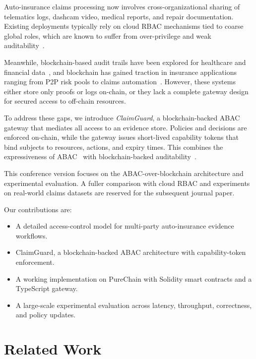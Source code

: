 \documentclass[conference]{IEEEtran}
\begin{document}
Auto-insurance claims processing now involves cross-organizational sharing of telematics logs, dashcam video, medical reports, and repair documentation. Existing deployments typically rely on cloud RBAC mechanisms tied to coarse global roles, which are known to suffer from over-privilege and weak auditability~\cite{hu_abac_nist, cloud_rbac_security}. 

Meanwhile, blockchain-based audit trails have been explored for healthcare and financial data~\cite{medrec, healthchain}, and blockchain has gained traction in insurance applications ranging from P2P risk pools to claims automation~\cite{nexusmutual, teambrella, cai_insurance_blockchain}. However, these systems either store only proofs or logs on-chain, or they lack a complete gateway design for secured access to off-chain resources.

To address these gaps, we introduce \emph{ClaimGuard}, a blockchain-backed ABAC gateway that mediates all access to an evidence store. Policies and decisions are enforced on-chain, while the gateway issues short-lived capability tokens that bind subjects to resources, actions, and expiry times. This combines the expressiveness of ABAC~\cite{hu_abac_nist} with blockchain-backed auditability~\cite{abac_blockchain_survey}.

This conference version focuses on the ABAC-over-blockchain architecture and experimental evaluation. A fuller comparison with cloud RBAC and experiments on real-world claims datasets are reserved for the subsequent journal paper.

Our contributions are:
\begin{itemize}
    \item A detailed access-control model for multi-party auto-insurance evidence workflows.
    \item ClaimGuard, a blockchain-backed ABAC architecture with capability-token enforcement.
    \item A working implementation on PureChain with Solidity smart contracts and a TypeScript gateway.
    \item A large-scale experimental evaluation across latency, throughput, correctness, and policy updates.
\end{itemize}

\section{Related Work}
\end{document}
